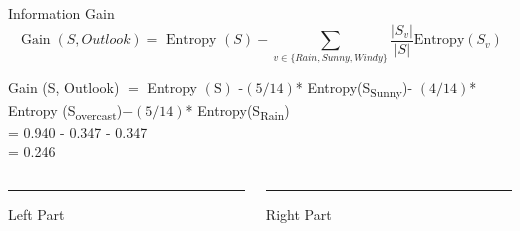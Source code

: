 \documentclass{beamer}
\begin{document}
\begin{frame}{Information Gain}
$$
\operatorname{Gain}(S, Outlook) = \text { Entropy }(S)-\sum_{v \in \{Rain, Sunny, Windy\}} \frac{\left|S_{v}\right|}{|S|} \text {Entropy}\left(S_{v}\right) 
$$

Gain (S, Outlook) $=$ Entropy $(\mathrm{S})$ -$(5 / 14)$* Entropy(S\textsubscript{Sunny})- $(4 / 14)$* Entropy (S\textsubscript{overcast})$-(5 / 14)$* Entropy(S\textsubscript{Rain}) \\

= 0.940 - 0.347 - 0.347 \\
= 0.246

\end{frame}

\begin{frame}

	
	

\end{frame}


\begin{frame}
\begin{columns}[T] %
	\begin{column}{.48\textwidth}
		\color{red}\rule{\linewidth}{4pt}
		
		Left Part
	\end{column}%
	\hfill%
	\begin{column}{.48\textwidth}
		\color{blue}\rule{\linewidth}{4pt}
		
		Right Part
	\end{column}%
\end{columns}
\end{frame}
\end{document}
